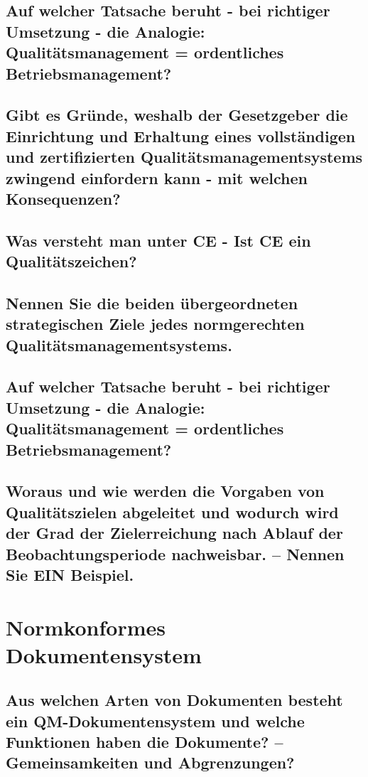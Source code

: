 	\subsection{Auf welcher Tatsache beruht - bei richtiger Umsetzung - die Analogie: Qualitätsmanagement = ordentliches Betriebsmanagement? }
	
	\subsection{Gibt es Gründe, weshalb der Gesetzgeber die Einrichtung und Erhaltung eines vollständigen und zertifizierten Qualitätsmanagementsystems zwingend einfordern kann - mit welchen Konsequenzen? }
	
	\subsection{Was versteht man unter CE - Ist CE ein Qualitätszeichen?}
	
	\subsection{Nennen Sie die beiden übergeordneten strategischen Ziele jedes normgerechten Qualitätsmanagementsystems.}
	
	\subsection{Auf welcher Tatsache beruht - bei richtiger Umsetzung - die Analogie: Qualitätsmanagement = ordentliches Betriebsmanagement? }
	
	\subsection{Woraus und wie werden die Vorgaben von Qualitätszielen abgeleitet und wodurch wird der Grad der Zielerreichung nach Ablauf der Beobachtungsperiode nachweisbar. – Nennen Sie EIN Beispiel.}
	
\section{Normkonformes Dokumentensystem}
	
	\subsection{Aus welchen Arten von Dokumenten besteht ein QM-Dokumentensystem und welche Funktionen haben die Dokumente? – Gemeinsamkeiten und Abgrenzungen?}
	
